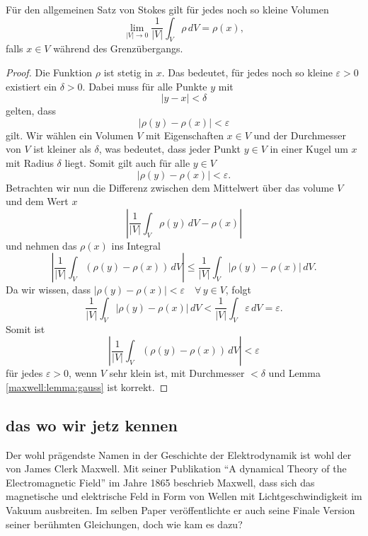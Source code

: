\begin{lemma}
	\label{maxwell:lemma:gauss}
	Für den allgemeinen Satz von Stokes gilt für jedes noch so kleine Volumen
	\[
	\lim_{\left| V \right| \to 0} \frac{1}{\left| V \right|} \int_{V} \rho \, dV = \rho(x),
	\]
	falls $x\in V$ während des Grenzübergangs.
\end{lemma}
\begin{proof}
	Die Funktion $\rho$ ist stetig in $x$. Das bedeutet, für jedes noch so kleine $\varepsilon > 0$ existiert ein $\delta > 0$.
	Dabei muss für alle Punkte $y$ mit
	\[
	\left|y-x\right| < \delta	
	\]
	gelten, dass 
	\[
	\left|\rho(y) - \rho(x)\right| < \varepsilon
	\] 
	gilt.
	Wir wählen ein Volumen $V$ mit Eigenschaften $x \in V$ und der Durchmesser von $V$ ist kleiner als $\delta$, was bedeutet, dass jeder Punkt $y \in V$ in einer Kugel um $x$ mit Radius $\delta$ liegt.
	Somit gilt auch für alle $y \in V$
	\[
	\left|\rho(y) - \rho(x)\right| < \varepsilon .
	\]
	Betrachten wir nun die Differenz zwischen dem Mittelwert über das volume $V$ und dem Wert $x$
	\[
	\left|
	\frac{1}{\left|V\right|}
	\int_{V}
	\rho(y)
	\,
	dV
	-
	\rho(x)
	\right|
	\]
	und nehmen das $\rho(x)$ ins Integral
	\[
	\left|
	\frac{1}{\left|V\right|}
	\int_{V}
	(\rho(y) - \rho(x)) \, dV
	\right|
	\leq
	\frac{1}{\left|V\right|}
	\int_{V}
	\left|
	\rho(y) - \rho(x)
	\right|
	\,
	dV .
	\]
	Da wir wissen, dass $\left|\rho(y) - \rho(x)\right| < \varepsilon \quad \forall \, y \in V$, folgt
	\[
	\frac{1}{\left|V\right|}
	\int_{V}
	\left|
	\rho(y) - \rho(x)
	\right|
	\,
	dV
	<
	\frac{1}{\left|V\right|}
	\int_{V}
	\varepsilon
	\,
	dV
	=
	\varepsilon .
	\]
	Somit ist 
	\[
	\left|
	\frac{1}{\left|V\right|}
	\int_{V}
	(\rho(y) - \rho(x)) \, dV
	\right|
	<
	\varepsilon
	\]
	für jedes $\varepsilon > 0$, wenn $V$ sehr klein ist, mit Durchmesser $< \delta$ und Lemma \ref{maxwell:lemma:gauss} ist korrekt.
\end{proof}



\subsection{das wo wir jetz kennen}
Der wohl prägendste Namen in der Geschichte der Elektrodynamik ist wohl der von James Clerk Maxwell.
Mit seiner Publikation ``A dynamical Theory of the Electromagnetic Field'' im Jahre 1865 beschrieb Maxwell, dass sich das magnetische und elektrische Feld in Form von Wellen mit Lichtgeschwindigkeit im Vakuum ausbreiten.
Im selben Paper veröffentlichte er auch seine Finale Version seiner berühmten Gleichungen, doch wie kam es dazu?

